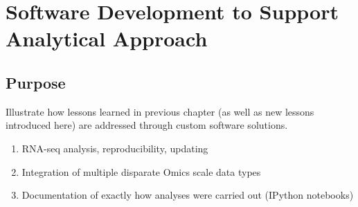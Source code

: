\chapter{Software Development to Support Analytical Approach}

\section{Purpose}
Illustrate how lessons learned in previous chapter (as well as new lessons introduced here) are addressed through custom software solutions.
\begin{enumerate}
 \item RNA-seq analysis, reproducibility, updating
 \item Integration of multiple disparate Omics scale data types
 \item Documentation of exactly how analyses were carried out (IPython notebooks)
\end{enumerate}



